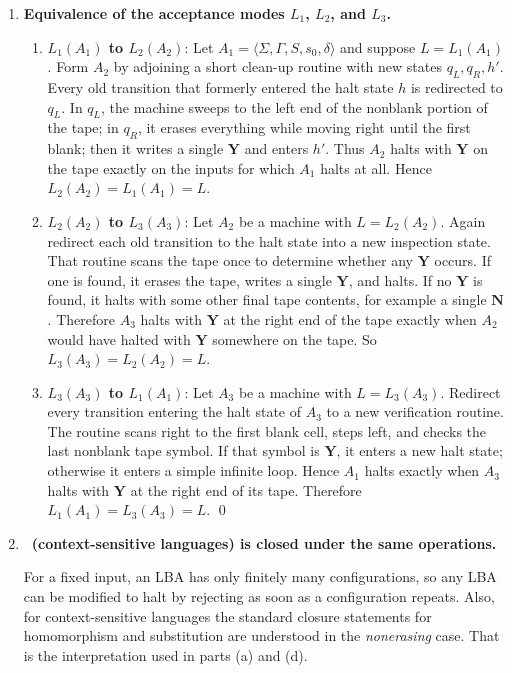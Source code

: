 \begin{enumerate}[{11.}1. ]
\item \textbf{Equivalence of the acceptance modes $L_1$, $L_2$, and $L_3$.}

\begin{enumerate}
\item \textbf{$L_1(A_1)$ to $L_2(A_2)$}: Let
$A_1=\langle\Sigma,\Gamma,S,s_0,\delta\rangle$ and suppose $L=L_1(A_1)$. Form
$A_2$ by adjoining a short clean-up routine with new states $q_L,q_R,h'$. Every
old transition that formerly entered the halt state $h$ is redirected to $q_L$.
In $q_L$, the machine sweeps to the left end of the nonblank portion of the
tape; in $q_R$, it erases everything while moving right until the first blank;
then it writes a single $\pmb{Y}$ and enters $h'$. Thus $A_2$ halts with
$\pmb{Y}$ on the tape exactly on the inputs for which $A_1$ halts at all. Hence
$L_2(A_2)=L_1(A_1)=L$.

\item \textbf{$L_2(A_2)$ to $L_3(A_3)$}: Let $A_2$ be a machine with
$L=L_2(A_2)$. Again redirect each old transition to the halt state into a new
inspection state. That routine scans the tape once to determine whether any
$\pmb{Y}$ occurs. If one is found, it erases the tape, writes a single
$\pmb{Y}$, and halts. If no $\pmb{Y}$ is found, it halts with some other final
tape contents, for example a single $\pmb{N}$. Therefore $A_3$ halts with
$\pmb{Y}$ at the right end of the tape exactly when $A_2$ would have halted with
$\pmb{Y}$ somewhere on the tape. So $L_3(A_3)=L_2(A_2)=L$.

\item \textbf{$L_3(A_3)$ to $L_1(A_1)$}: Let $A_3$ be a machine with
$L=L_3(A_3)$. Redirect every transition entering the halt state of $A_3$ to a
new verification routine. The routine scans right to the first blank cell,
steps left, and checks the last nonblank tape symbol. If that symbol is
$\pmb{Y}$, it enters a new halt state; otherwise it enters a simple infinite
loop. Hence $A_1$ halts exactly when $A_3$ halts with $\pmb{Y}$ at the right end
of its tape. Therefore $L_1(A_1)=L_3(A_3)=L$. \qed
\end{enumerate}

\item \textbf{\OSIG\ (context-sensitive languages) is closed under the same operations.}

For a fixed input, an LBA has only finitely many configurations, so any LBA can
be modified to halt by rejecting as soon as a configuration repeats. Also, for
context-sensitive languages the standard closure statements for homomorphism and
substitution are understood in the \emph{nonerasing} case. That is the
interpretation used in parts (a) and (d).


\end{enumerate}

